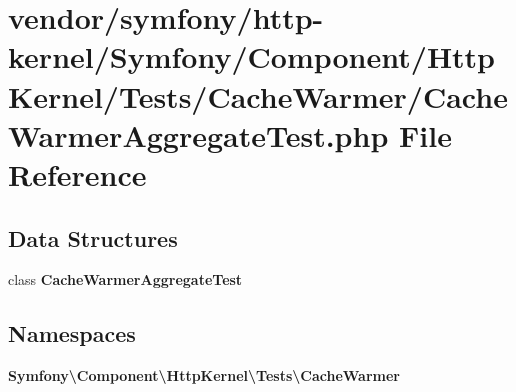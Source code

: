 \section{vendor/symfony/http-\/kernel/\+Symfony/\+Component/\+Http\+Kernel/\+Tests/\+Cache\+Warmer/\+Cache\+Warmer\+Aggregate\+Test.php File Reference}
\label{_cache_warmer_aggregate_test_8php}
\subsection*{Data Structures}
\begin{DoxyCompactItemize}
\item 
class {\bf Cache\+Warmer\+Aggregate\+Test}
\end{DoxyCompactItemize}
\subsection*{Namespaces}
\begin{DoxyCompactItemize}
\item 
 {\bf Symfony\textbackslash{}\+Component\textbackslash{}\+Http\+Kernel\textbackslash{}\+Tests\textbackslash{}\+Cache\+Warmer}
\end{DoxyCompactItemize}
